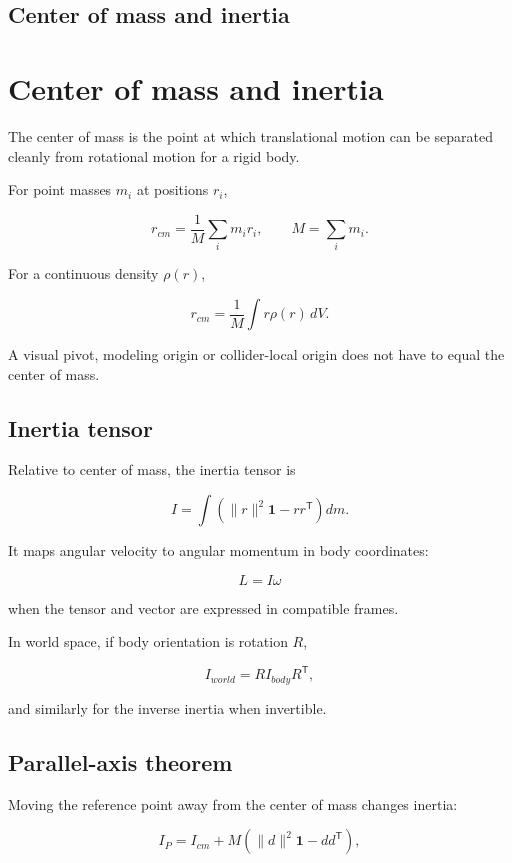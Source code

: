 \hypertarget{appendix-66742099f8a0}{}
\section*{Center of mass and inertia}
\chapter{Center of mass and inertia}\label{appendix-66742099f8a0-center-of-mass-and-inertia}

The center of mass is the point at which translational motion can be separated cleanly from rotational motion for a rigid body.

For point masses \(m_i\) at positions \(r_i\),

\[
r_{cm}=\frac{1}{M}\sum_i m_i r_i,
\qquad
M=\sum_i m_i.
\]

For a continuous density \(\rho(r)\),

\[
r_{cm}=\frac{1}{M}\int r\rho(r)\,dV.
\]

A visual pivot, modeling origin or collider-local origin does not have to equal the center of mass.

\section{Inertia tensor}\label{appendix-66742099f8a0-inertia-tensor}

Relative to center of mass, the inertia tensor is

\[
I=
\int
\left(
\|r\|^2\mathbf{1}-rr^{\mathsf T}
\right)dm.
\]

It maps angular velocity to angular momentum in body coordinates:

\[
L=I\omega
\]

when the tensor and vector are expressed in compatible frames.

In world space, if body orientation is rotation \(R\),

\[
I_{world}=RI_{body}R^{\mathsf T},
\]

and similarly for the inverse inertia when invertible.

\section{Parallel-axis theorem}\label{appendix-66742099f8a0-parallel-axis-theorem}

Moving the reference point away from the center of mass changes inertia:

\[
I_P=
I_{cm}
+
M\left(
\|d\|^2\mathbf{1}-dd^{\mathsf T}
\right),
\]


